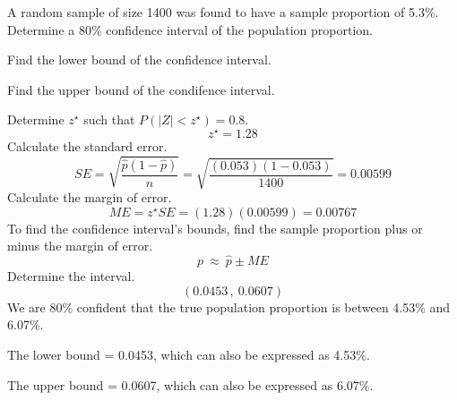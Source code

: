 
\begin{question}
A random sample of size 1400 was found to have a sample proportion of
5.3\%. Determine a 80\% confidence interval of the population
proportion.
\begin{answerlist}
  \item Find the lower bound of the confidence interval.
  \item Find the upper bound of the condifence interval.
\end{answerlist}
\end{question}

\begin{solution}
Determine \(z^\star\) such that \(P(|Z|<z^\star) = 0.8\).
\[z^\star = 1.28 \] Calculate the standard error.
\[SE = \sqrt{\frac{\hat{p}(1-\hat{p})}{n}} = \sqrt{\frac{(0.053)(1-0.053)}{1400}} = 0.00599 \]
Calculate the margin of error.
\[ME = z^\star SE = (1.28)(0.00599) = 0.00767 \] To find the confidence
interval's bounds, find the sample proportion plus or minus the margin
of error. \[p ~\approx~ \hat{p} \pm ME \] Determine the interval.
\[(0.0453\,,~ 0.0607) \] We are 80\% confident that the true population
proportion is between 4.53\% and 6.07\%.
\begin{answerlist}
  \item The lower bound = 0.0453, which can also be expressed as 4.53\%.
  \item The upper bound = 0.0607, which can also be expressed as 6.07\%.
\end{answerlist}
\end{solution}

